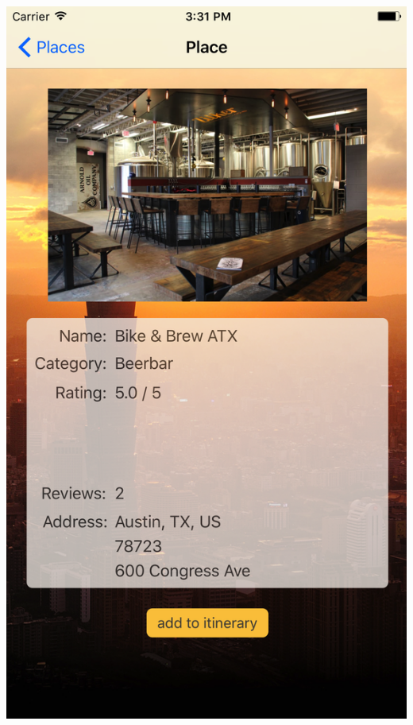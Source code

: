\documentclass{beamer}
\begin{document}
\begin{frame}
\begin{columns}
\begin{column}{0.3\textwidth}
\begin{center}
            \includegraphics[scale=0.08]{placesDetail}
        \end{center}
    \end{column}
\end{columns}
\end{frame}
\end{document}
